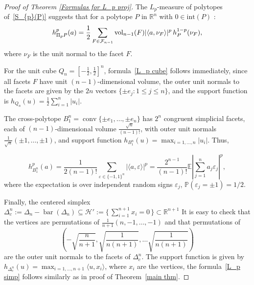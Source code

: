 \documentclass[10pt]{amsart}
\newcommand{\gr}{\geqslant}
\newcommand{\E}{\mathbb{E}}
\newcommand{\1}{\textbf{1}}
\numberwithin{equation}{section} %
\theoremstyle{remark}
\theoremstyle{definition}
\begin{document}

\begin{proof}[Proof of Theorem \ref{Formulas for L_p proj}]
The $L_p$-measure of polytopes of~\eqref{S_{p}(P)} suggests that for a polytope $P$ in $\mathbb{R}^n$ with $0\in \text{int}(P)$ :
\begin{equation}\label{h_{piP} polytope}
 h_{\Pi_pP}^p(a)  =\frac{1}{2}\sum_{F\in \mathcal{F}_{n-1}}\operatorname{vol}_{n-1}(F)|\langle a,\nu_F \rangle|^p \,h_P^{1-p}(\nu_F),
\end{equation}
where $\nu_F$ is the unit normal to the facet $F$.


For the unit cube $Q_n = \left[-\tfrac{1}{2}, \tfrac{1}{2}\right]^n$, formula~\eqref{L_p cube} follows immediately, since all facets $F$ have unit $(n-1)$-dimensional volume, the outer unit normals to the facets are given by the $2n$ vectors $\{\pm e_j : 1 \le j \le n\}$, and the support function is $h_{Q_n}(u) = \tfrac{1}{2} \sum_{i=1}^n |u_i|$.


The cross-polytope $B_1^n = \operatorname{conv}\{\pm e_1, \ldots, \pm e_n\}$ has $2^n$ congruent simplicial facets, each of $(n-1)$-dimensional volume $\tfrac{\sqrt{n}}{(n-1)!}$, with outer unit normals 
$\tfrac{1}{\sqrt{n}}(\pm 1, \ldots, \pm 1)$, 
and support function 
$h_{B_1^n}(u) = \max_{i=1,\ldots,n} |u_i|$. 
Thus,

\[
h^p_{B_1^n}(a)=\frac{1}{2(n-1)!}\sum_{\varepsilon\in \{-1,1\}^n}|\langle a,\varepsilon\rangle|^p=\frac{2^{n-1}}{(n-1)!}\E \left|\sum_{j=1}^na_j \varepsilon_j \right|^p,
\]
where the expectation is over independent random signs $\varepsilon_j$, $\mathbb{P}(\varepsilon_j=\pm1)=
1/2$.

Finally, the centered simplex 
$\Delta_c^n := \Delta_n - \operatorname{bar}(\Delta_n) \subseteq \mathcal{H}' := \{\, \sum_{i=1}^{n+1} x_i = 0 \,\} \subset \mathbb{R}^{n+1}$ 
It is easy to check that the vertices  are permutations of $\frac{1}{n+1}(n,-1,\ldots,-1)$ and  that  permutations of $$\left( -\sqrt{\frac{n}{n+1}},\sqrt{\frac{1}{n(n+1)}},\ldots\sqrt{\frac{1}{n(n+1)}}\right)$$ are the outer unit normals to the facets of $\Delta_c^n$. The support function is given by $h_{\Delta_c^n}(u)=\max_{i=1,\ldots,n+1}\langle u,x_i \rangle$, where $x_i$ are the vertices, the formula~\eqref{L_p simp} follows similarly as in proof of Theorem~\ref{main thm}.
\end{proof}
\end{document}
